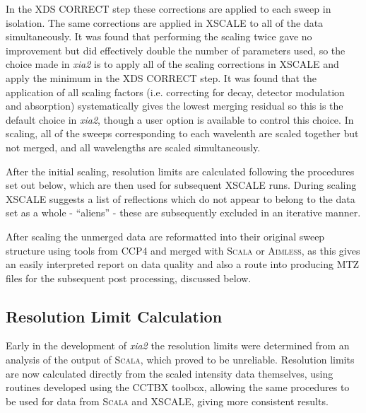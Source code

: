 \documentclass[preprint,pdf]{iucr}
\begin{document}
In the XDS CORRECT step these corrections are applied to each sweep in
isolation. The same corrections are applied in XSCALE to all of the
data simultaneously. It was found that performing the scaling twice
gave no improvement but did effectively double the number of
parameters used, so the choice made in \emph{xia2} is to apply all of
the scaling corrections in XSCALE and apply the minimum in the XDS
CORRECT step. It was found that the application of all scaling factors
(i.e. correcting for decay, detector modulation and absorption)
systematically gives the lowest merging residual so this is the
default choice in \emph{xia2}, though a user option is available to
control this choice. In scaling, all of the sweeps corresponding to
each wavelenth are scaled together but not merged, and
all wavelengths are scaled simultaneously. 

After the initial scaling, resolution limits are calculated
following the procedures set out below, which are then used for subsequent
XSCALE runs. During scaling XSCALE suggests a
list of reflections which do not appear to belong to the data set as a
whole - ``aliens'' - these are subsequently excluded in an iterative manner.

After scaling the unmerged data are reformatted into their original
sweep structure using tools from CCP4
and merged with \textsc{Scala} or \textsc{Aimless}, as this gives an
easily interpreted report on data quality and also a route into
producing MTZ files for the subsequent post processing, discussed below.

\subsection{Resolution Limit Calculation}

Early in the development of \emph{xia2} the resolution limits were
determined from an analysis of the output of \textsc{Scala}, which proved to be
unreliable. Resolution limits are now calculated directly from the
scaled intensity data themselves, using routines developed using
the CCTBX toolbox, allowing the same procedures to be used for data from \textsc{Scala}
and XSCALE, giving more consistent results.
\end{document}
